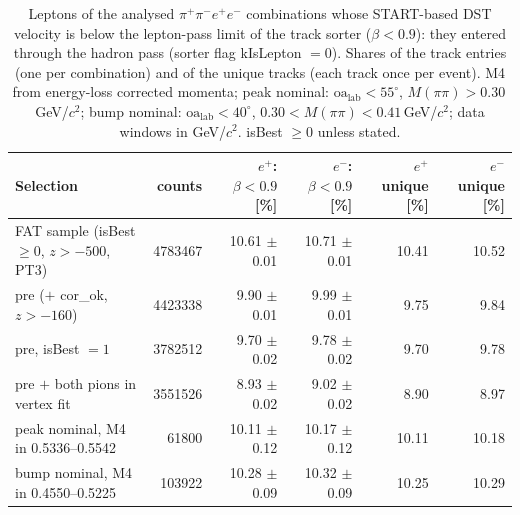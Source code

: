 \begin{table}[H]
\centering
\caption{Leptons of the analysed $\pi^+\pi^-e^+e^-$ combinations whose START-based DST velocity is below the lepton-pass limit of the track sorter ($\beta<0.9$): they entered through the hadron pass (sorter flag kIsLepton $=0$). Shares of the track entries (one per combination) and of the unique tracks (each track once per event). M4 from energy-loss corrected momenta; peak nominal: $\mathrm{oa_{lab}}<55^\circ$, $M(\pi\pi)>0.30$\,GeV/$c^2$; bump nominal: $\mathrm{oa_{lab}}<40^\circ$, $0.30<M(\pi\pi)<0.41$\,GeV/$c^2$; data windows in GeV/$c^2$. isBest $\geq 0$ unless stated.}
\label{tab:pid_dstbeta}
\footnotesize
\setlength{\tabcolsep}{4pt}
\begin{tabular}{@{}l r r r r r@{}}
\toprule
Selection & counts & $e^+$: $\beta<0.9$ [\%] & $e^-$: $\beta<0.9$ [\%] & $e^+$ unique [\%] & $e^-$ unique [\%] \\
\midrule
FAT sample (isBest $\geq 0$, $z>-500$, PT3) & 4783467 & 10.61 $\pm$ 0.01 & 10.71 $\pm$ 0.01 & 10.41 & 10.52 \\
pre ($+$ cor\_ok, $z>-160$) & 4423338 & 9.90 $\pm$ 0.01 & 9.99 $\pm$ 0.01 & 9.75 & 9.84 \\
pre, isBest $=1$ & 3782512 & 9.70 $\pm$ 0.02 & 9.78 $\pm$ 0.02 & 9.70 & 9.78 \\
pre $+$ both pions in vertex fit & 3551526 & 8.93 $\pm$ 0.02 & 9.02 $\pm$ 0.02 & 8.90 & 8.97 \\
peak nominal, M4 in 0.5336--0.5542 & 61800 & 10.11 $\pm$ 0.12 & 10.17 $\pm$ 0.12 & 10.11 & 10.18 \\
bump nominal, M4 in 0.4550--0.5225 & 103922 & 10.28 $\pm$ 0.09 & 10.32 $\pm$ 0.09 & 10.25 & 10.29 \\
\bottomrule
\end{tabular}
\end{table}
